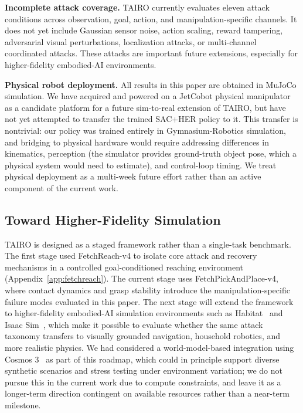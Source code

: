 \documentclass[conference]{IEEEtran}
\begin{document}
\textbf{Incomplete attack coverage.}
TAIRO currently evaluates eleven attack conditions across observation, goal, action, and
manipulation-specific channels. It does not yet include Gaussian sensor noise, action
scaling, reward tampering, adversarial visual perturbations, localization attacks, or
multi-channel coordinated attacks. These attacks are important future extensions,
especially for higher-fidelity embodied-AI environments.

\textbf{Physical robot deployment.}
All results in this paper are obtained in MuJoCo simulation. We have acquired and
powered on a JetCobot physical manipulator as a candidate platform for a future
sim-to-real extension of TAIRO, but have not yet attempted to transfer the trained
SAC+HER policy to it. This transfer is nontrivial: our policy was trained entirely in
Gymnasium-Robotics simulation, and bridging to physical hardware would require
addressing differences in kinematics, perception (the simulator provides ground-truth
object pose, which a physical system would need to estimate), and control-loop timing.
We treat physical deployment as a multi-week future effort rather than an active
component of the current work.

\subsection{Toward Higher-Fidelity Simulation}

TAIRO is designed as a staged framework rather than a single-task benchmark. The first
stage used FetchReach-v4 to isolate core attack and recovery mechanisms in a controlled
goal-conditioned reaching environment (Appendix~\ref{app:fetchreach}). The current stage
uses FetchPickAndPlace-v4, where contact dynamics and grasp stability introduce the
manipulation-specific failure modes evaluated in this paper. The next stage will extend
the framework to higher-fidelity embodied-AI simulation environments such as
Habitat~\cite{puig2023habitat3} and Isaac Sim~\cite{nvidia2026isaacsim}, which make it
possible to evaluate whether the same attack taxonomy transfers to visually grounded
navigation, household robotics, and more realistic physics. We had considered a
world-model-based integration using Cosmos 3~\cite{agarwal2026cosmos3} as part of this
roadmap, which could in principle support diverse synthetic scenarios and stress
testing under environment variation; we do not pursue this in the current work due to
compute constraints, and leave it as a longer-term direction contingent on available
resources rather than a near-term milestone.
\end{document}
